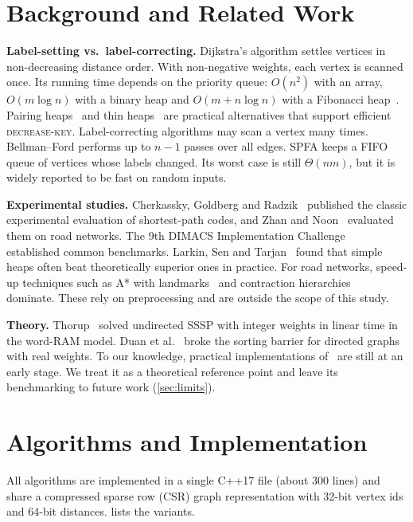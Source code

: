 \documentclass[conference]{IEEEtran}
\begin{document}
\section{Background and Related Work}

\textbf{Label-setting vs.\ label-correcting.} Dijkstra's algorithm settles
vertices in non-decreasing distance order. With non-negative weights, each
vertex is scanned once. Its running time depends on the priority queue:
$O(n^2)$ with an array, $O(m\log n)$ with a binary heap and
$O(m+n\log n)$ with a Fibonacci heap~\cite{fredman1987}. Pairing
heaps~\cite{fredman1986pairing} and thin heaps~\cite{kaplan2008thin} are
practical alternatives that support efficient \textsc{decrease-key}.
Label-correcting algorithms may scan a vertex many times. Bellman--Ford performs
up to $n-1$ passes over all edges. SPFA keeps a FIFO queue of vertices whose
labels changed. Its worst case is still $\Theta(nm)$, but it is widely reported
to be fast on random inputs.

\textbf{Experimental studies.} Cherkassky, Goldberg and
Radzik~\cite{cherkassky1996} published the classic experimental evaluation of
shortest-path codes, and Zhan and Noon~\cite{zhan1998} evaluated them on road
networks. The 9th DIMACS Implementation Challenge~\cite{dimacs2009} established
common benchmarks. Larkin, Sen and Tarjan~\cite{larkin2014} found that simple
heaps often beat theoretically superior ones in practice. For road networks,
speed-up techniques such as A* with landmarks~\cite{goldberg2005} and
contraction hierarchies~\cite{geisberger2008} dominate. These rely on
preprocessing and are outside the scope of this study.

\textbf{Theory.} Thorup~\cite{thorup1999} solved undirected SSSP with integer
weights in linear time in the word-RAM model. Duan et al.~\cite{duan2025} broke
the sorting barrier for directed graphs with real weights. To our knowledge,
practical implementations of~\cite{duan2025} are still at an early stage. We
treat it as a theoretical reference point and leave its benchmarking to future
work (\cref{sec:limits}).

\section{Algorithms and Implementation}

All algorithms are implemented in a single C++17 file (about 300 lines) and share
a compressed sparse row (CSR) graph representation with 32-bit vertex ids and
64-bit distances.  lists the variants.
\end{document}
